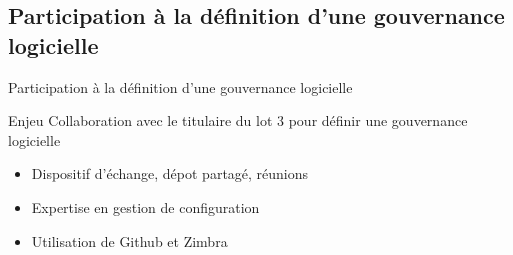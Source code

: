 \subsection{Participation à la définition d'une gouvernance logicielle}
\begin{frame}{Participation à la définition d'une gouvernance logicielle}
			\begin{block}{Enjeu}
				Collaboration avec le titulaire du lot \no{}3 pour définir une gouvernance logicielle
			\end{block}
			\begin{itemize}
				\item Dispositif d'échange, dépot partagé, réunions
				\item Expertise en gestion de configuration
				\item Utilisation de Github et Zimbra
			\end{itemize}
\end{frame}